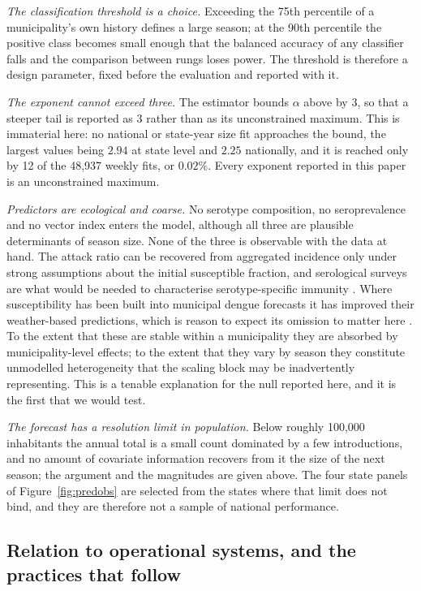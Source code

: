 \documentclass[english,10pt,b5paper]{article}
\begin{document}
\emph{The classification threshold is a choice.} Exceeding the 75th percentile
of a municipality's own history defines a large season; at the 90th percentile
the positive class becomes small enough that the balanced accuracy of any
classifier falls and the comparison between rungs loses power. The threshold
is therefore a design parameter, fixed before the evaluation and reported with
it.

\emph{The exponent cannot exceed three.} The estimator bounds $\alpha$ above by $3$,
so that a steeper tail is reported as $3$ rather than as its unconstrained maximum.
This is immaterial here: no national or state-year size fit approaches the bound, the
largest values being $2.94$ at state level and $2.25$ nationally, and it is
reached only by 12 of the 48{,}937 weekly fits, or $0.02\%$. Every exponent reported
in this paper is an unconstrained maximum.

\emph{Predictors are ecological and coarse.} No serotype composition, no
seroprevalence and no vector index enters the model, although all three are
plausible determinants of season size. None of the three is observable with
the data at hand. The attack ratio can be recovered from aggregated incidence
only under strong assumptions about the initial susceptible fraction, and
serological surveys are what would be needed to characterise serotype-specific
immunity \citep{coelho2015attack}. Where susceptibility has been built into
municipal dengue forecasts it has improved their weather-based predictions,
which is reason to expect its omission to matter here
\citep{mcgough2021dynamic}. To the extent that these are stable within a
municipality they are absorbed by municipality-level effects; to the extent
that they vary by season they constitute unmodelled heterogeneity that the
scaling block may be inadvertently representing. This is a tenable explanation
for the null reported here, and it is the first that we would test.

\emph{The forecast has a resolution limit in population.} Below roughly
100{,}000 inhabitants the annual total is a small count dominated by a few
introductions, and no amount of covariate information recovers from it the size
of the next season; the argument and the magnitudes are
given above. The four state panels of Figure~\ref{fig:predobs}
are selected from the states where that limit does not bind, and they are
therefore not a sample of national performance.

\subsection{Relation to operational systems, and the practices that follow}
\end{document}
